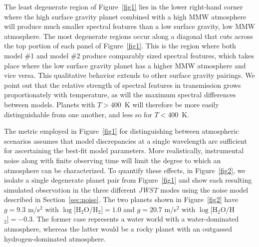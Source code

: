 \documentclass[iop]{emulateapj}
\begin{document}
The least degenerate region of Figure~\ref{fig1} lies in the lower right-hand corner where the high surface gravity planet combined with a high MMW atmosphere will produce much smaller spectral features than a low surface gravity, low MMW atmosphere.  The most degenerate regions occur along a diagonal that cuts across the top portion of each panel of Figure~\ref{fig1}.  This is the region where both model \#1 and model \#2 produce comparably sized spectral features, which takes place where the low surface gravity planet has a higher MMW atmosphere and vice versa.  This qualitative behavior extends to other surface gravity pairings.  We point out that the relative strength of spectral features in transmission grows proportionately with temperature, as will the maximum spectral differences between models. Planets with $T>400$~K will therefore be more easily distinguishable from one another, and less so for $T<400$~K.  
 
The metric employed in Figure~\ref{fig1} for distinguishing between atmospheric scenarios assumes that model discrepancies at a single wavelength are sufficient for ascertaining the best-fit model parameters.  More realistically, instrumental noise along with finite observing time will limit the degree to which an atmosphere can be characterized.  To quantify these effects, in Figure~\ref{fig2}, we isolate a single degenerate planet pair from Figure~\ref{fig1} and show each resulting simulated observation in the three different \emph{JWST} modes using the noise model described in Section~\ref{sec:noise}.  The two planets shown in Figure~\ref{fig2} have $g = 9.3$ m/s$^2$ with $\log[$H$_2$O/H$_2]=1.0$ and $g = 20.7$ m/s$^2$ with $\log[$H$_2$O/H$_2]=-0.3$. The former case represents a water world with a water-dominated atmosphere, whereas the latter would be a rocky planet with an outgassed hydrogen-dominated atmosphere.  
\end{document}
